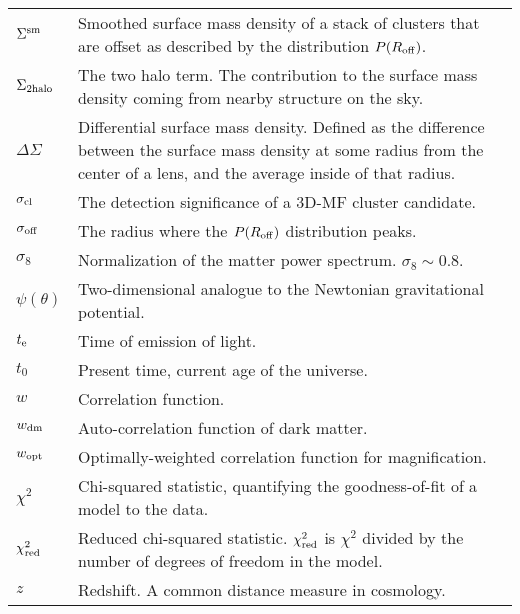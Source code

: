 \begin{tabular}{p{0.6in}p{5.8in}}
$\Sigma^{\rm sm}$ & Smoothed surface mass density of a stack of clusters that are offset as described by the distribution $P(R_{\rm off})$. \\
$\Sigma_{\rm 2halo}$ & The two halo term. The contribution to the surface mass density coming from nearby structure on the sky. \\
$\Delta\Sigma$ & Differential surface mass density. Defined as the difference between the surface mass density at some radius from the center of a lens, and the average inside of that radius. \\
$\sigma_{\rm cl}$ & The detection significance of a \acs{3D-MF} cluster candidate. \\
$\sigma_{\rm off}$ & The radius where the $P(R_{\rm off})$ distribution peaks. \\
$\sigma_8$ & Normalization of the matter power spectrum.  $\sigma_8 \sim 0.8$. \\
$\psi(\theta)$ & Two-dimensional analogue to the Newtonian gravitational potential. \\
$t_{\rm e}$ & Time of emission of light. \\
$t_0$ & Present time, current age of the universe. \\
$w$ & Correlation function. \\
$w_{\rm dm}$ & Auto-correlation function of dark matter. \\
$w_{\rm opt}$ & Optimally-weighted correlation function for magnification. \\
$\chi^2$ & Chi-squared statistic, quantifying the goodness-of-fit of a model to the data. \\
$\chi^2_{\rm red}$ & Reduced chi-squared statistic. $\chi^2_{\rm red}$ is $\chi^2$ divided by the number of degrees of freedom in the model. \\
$z$ & Redshift. A common distance measure in cosmology. \\

\end{tabular}



% 
